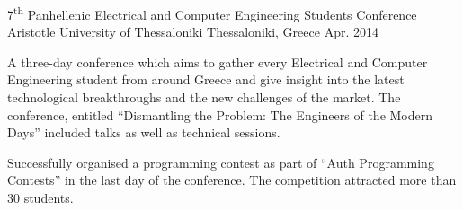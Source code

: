 

\begin{cventries}

  \cventry
    {7\textsuperscript{th} Panhellenic Electrical and Computer Engineering Students Conference} %
    {Aristotle University of Thessaloniki} %
    {Thessaloniki, Greece} %
    {Apr. 2014} %
    {
      \begin{cvitems} %
        \item {A three-day conference which aims to gather every Electrical and Computer Engineering student from around Greece and give insight into the latest technological breakthroughs and the new challenges of the market. The conference, entitled ``Dismantling the Problem: The Engineers of the Modern Days'' included talks as well as technical sessions.}
        \item {Successfully organised a programming contest as part of ``Auth Programming Contests'' in the last day of the conference. The competition attracted more than 30 students.}
      \end{cvitems}
    }

\end{cventries}
